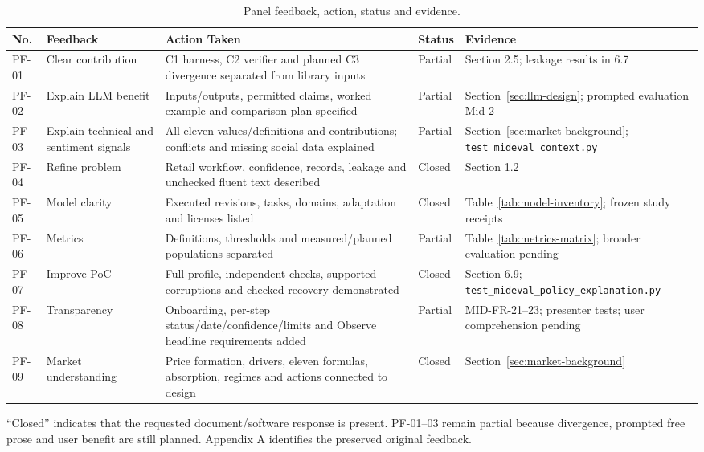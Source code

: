 \begin{longtable}{p{}p{}p{}p{}p{}}
\caption{Panel feedback, action, status and evidence.}\label{tab:panel-actions}\\\toprule No. & Feedback & Action Taken & Status & Evidence\\\midrule
PF-01 & Clear contribution & C1 harness, C2 verifier and planned C3 divergence separated from library inputs & Partial & Section 2.5; leakage results in 6.7\\
PF-02 & Explain LLM benefit & Inputs/outputs, permitted claims, worked example and comparison plan specified & Partial & Section~\ref{sec:llm-design}; prompted evaluation Mid-2\\
PF-03 & Explain technical and sentiment signals & All eleven values/definitions and contributions; conflicts and missing social data explained & Partial & Section~\ref{sec:market-background}; \nolinkurl{test_mideval_context.py}\\
PF-04 & Refine problem & Retail workflow, confidence, records, leakage and unchecked fluent text described & Closed & Section 1.2\\
PF-05 & Model clarity & Executed revisions, tasks, domains, adaptation and licenses listed & Closed & Table~\ref{tab:model-inventory}; frozen study receipts\\
PF-06 & Metrics & Definitions, thresholds and measured/planned populations separated & Partial & Table~\ref{tab:metrics-matrix}; broader evaluation pending\\
PF-07 & Improve PoC & Full profile, independent checks, supported corruptions and checked recovery demonstrated & Closed & Section 6.9; \nolinkurl{test_mideval_policy_explanation.py}\\
PF-08 & Transparency & Onboarding, per-step status/date/confidence/limits and Observe headline requirements added & Partial & MID-FR-21--23; presenter tests; user comprehension pending\\
PF-09 & Market understanding & Price formation, drivers, eleven formulas, absorption, regimes and actions connected to design & Closed & Section~\ref{sec:market-background}\\
\bottomrule\end{longtable}\endgroup
``Closed'' indicates that the requested document/software response is present. PF-01--03 remain partial because divergence, prompted free prose and user benefit are still planned. Appendix A identifies the preserved original feedback.
